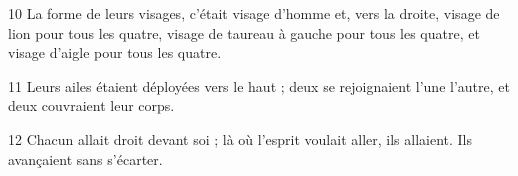 
10 La forme de leurs visages, c’était visage d’homme et, vers la droite, visage de lion pour tous les quatre, visage de taureau à gauche pour tous les quatre, et visage d’aigle pour tous les quatre.

11 Leurs ailes étaient déployées vers le haut ; deux se rejoignaient l’une l’autre, et deux couvraient leur corps.

12 Chacun allait droit devant soi ; là où l’esprit voulait aller, ils allaient. Ils avançaient sans s’écarter.